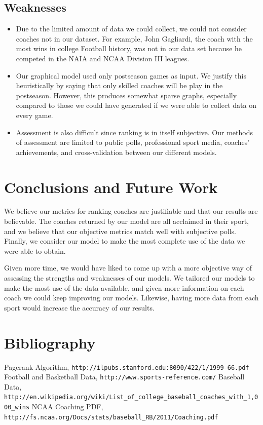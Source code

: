 \documentclass[11pt,notitlepage]{article}
\begin{document}
\subsection{Weaknesses}
\begin{itemize}
\item Due to the limited amount of data we could collect, we could not consider coaches not in our dataset. For example, John Gagliardi, the coach with the most wins in college Football history, was not in our data set because he competed in the NAIA and NCAA Division III leagues. 

\item Our graphical model used only postseason games as input. We justify this heuristically by saying that only skilled coaches will be play in the postseason. However, this produces somewhat sparse graphs, especially compared to those we could have generated if we were able to collect data on every game.

\item Assessment is also difficult since ranking is in itself subjective. Our methods of assessment are limited to public polls, professional sport media, coaches' achievements, and cross-validation between our different models.

\end{itemize}

\section{Conclusions and Future Work}
We believe our metrics for ranking coaches are justifiable and that our results are believable. The coaches returned by our model are all acclaimed in their sport, and we believe that our objective metrics match well with subjective polls. Finally, we consider our model to make the most complete use of the data we were able to obtain.

Given more time, we would have liked to come up with a more objective way of assessing the strengths and weaknesses of our models. We tailored our models to make the most use of the data available, and given more information on each coach we could keep improving our models. Likewise, having more data from each sport would increase the accuracy of our results.


\pagebreak

\section{Bibliography}
\begin{thebibliography}{9}

 Pagerank Algorithm,
\verb|http://ilpubs.stanford.edu:8090/422/1/1999-66.pdf|
 Football and Basketball Data,
\verb|http://www.sports-reference.com/|
 Baseball Data,
\verb|http://en.wikipedia.org/wiki/List_of_college_baseball_coaches_with_1,000_wins|
 NCAA Coaching PDF,
\verb|http://fs.ncaa.org/Docs/stats/baseball_RB/2011/Coaching.pdf|


\end{thebibliography}
\end{document}
